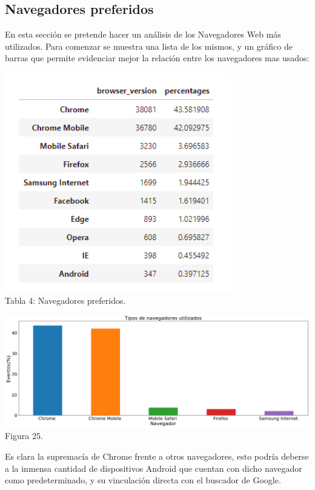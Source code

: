 \documentclass[a4paper ,12pt]{article}
\begin{document}
\subsection{Navegadores preferidos}


En esta sección se pretende hacer un análisis de los Navegadores Web más utilizados. Para comenzar se muestra una lista de los mismos, y un gráfico de barras que permite evidenciar mejor la relación entre los navegadores mas usados:\\

\begin{center}
	\includegraphics[width=0.7\linewidth]{table_4}
	\\Tabla 4: Navegadores preferidos.
	
\end{center}

\begin{center}
	\includegraphics[width=1.1\linewidth]{output_83_1}
	Figura 25.
	
\end{center}

Es clara la supremacía de Chrome frente a otros navegadores, esto podría deberse a la inmensa cantidad de dispositivos Android que cuentan con dicho navegador como predeterminado, y su vinculación directa con el buscador de Google.\\
\end{document}
